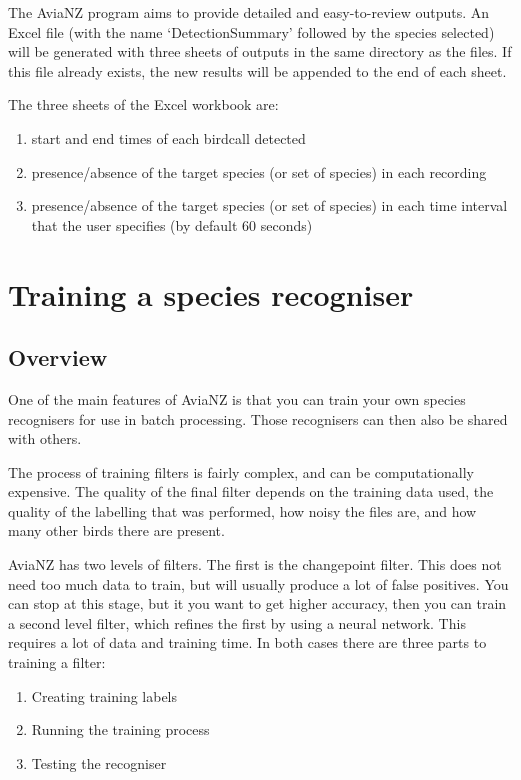 \documentclass{article}
\begin{document}
The AviaNZ program aims to provide detailed and easy-to-review outputs. An Excel file (with the name `DetectionSummary' followed by the species selected) will be generated with three sheets of outputs in the same directory as the files. If this file already exists, the new results will be appended to the end of each sheet. 

The three sheets of the Excel workbook are:
\begin{enumerate}
\item start and end times of each birdcall detected
\item presence/absence of the target species (or set of species) in each recording
\item  presence/absence of the target species (or set of species) in each time interval that the user specifies (by default 60 seconds)
\end{enumerate}

\newpage
\section{Training a species recogniser}\label{sec:trainfilter}

\subsection{Overview}

One of the main features of AviaNZ is that you can train your own species recognisers for use in batch processing. Those recognisers can then also be shared with others. 

The process of training filters is fairly complex, and can be computationally expensive. The quality of the final filter depends on the training data used, the quality of the labelling that was performed, how noisy the files are, and how many other birds there are present.

AviaNZ has two levels of filters. The first is the changepoint  filter. This does not need too much data to train, but will usually produce a lot of false positives. You can stop at this stage, but it you want to get higher accuracy, then you can train a second level filter, which refines the first by using a neural network. This requires a lot of data and training time. In both cases there are three parts to training a filter:

\begin{enumerate}
\item Creating training labels
\item Running the training process
\item Testing the recogniser
\end{enumerate}
\end{document}

